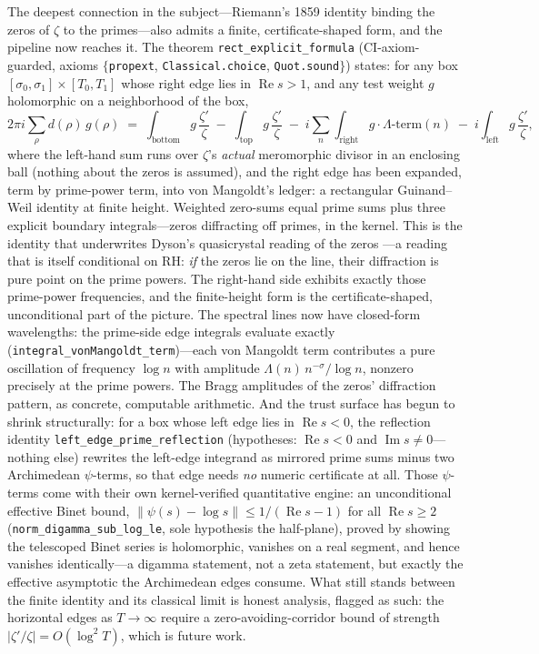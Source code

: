 The deepest connection in the subject---Riemann's 1859 identity binding the
zeros of $\zeta$ to the primes---also admits a finite, certificate-shaped form,
and the pipeline now reaches it. The theorem
\texttt{rect\_explicit\_formula} (CI-axiom-guarded, axioms
$\{$\texttt{propext}, \texttt{Classical.choice}, \texttt{Quot.sound}$\}$) states:
for any box $[\sigma_0,\sigma_1] \times [T_0,T_1]$ whose right edge lies in
$\operatorname{Re} s > 1$, and any test weight $g$ holomorphic on a neighborhood
of the box,
\[
  2\pi i \sum_{\rho} d(\rho)\, g(\rho)
  \;=\; \int_{\mathrm{bottom}} g\,\frac{\zeta'}{\zeta}
  \;-\; \int_{\mathrm{top}} g\,\frac{\zeta'}{\zeta}
  \;-\; i \sum_{n}\int_{\mathrm{right}} g \cdot \Lambda\text{-term}(n)
  \;-\; i \int_{\mathrm{left}} g\,\frac{\zeta'}{\zeta},
\]
where the left-hand sum runs over $\zeta$'s \emph{actual} meromorphic divisor in
an enclosing ball (nothing about the zeros is assumed), and the right edge has
been expanded, term by prime-power term, into von Mangoldt's ledger: a
rectangular Guinand--Weil identity \cite{guinand1948,weil1952} at finite height.
Weighted zero-sums equal prime sums plus three explicit boundary integrals---zeros
diffracting off primes, in the kernel. This is the identity that underwrites
Dyson's quasicrystal reading of the zeros \cite{dyson2009}---a reading that is
itself conditional on RH: \emph{if} the zeros lie on the line, their diffraction
is pure point on the prime powers. The right-hand side exhibits exactly those
prime-power frequencies, and the finite-height form is the certificate-shaped,
unconditional part of the picture. The spectral lines now have closed-form wavelengths: the prime-side
edge integrals evaluate exactly (\texttt{integral\_vonMangoldt\_term})---each von
Mangoldt term contributes a pure oscillation of frequency $\log n$ with
amplitude $\Lambda(n)\, n^{-\sigma}/\log n$, nonzero precisely at the prime
powers. The Bragg amplitudes of the zeros' diffraction pattern, as concrete,
computable arithmetic. And the trust surface has begun to shrink structurally:
for a box whose left edge lies in $\operatorname{Re} s < 0$, the reflection
identity \texttt{left\_edge\_prime\_reflection} (hypotheses: $\operatorname{Re}
s < 0$ and $\operatorname{Im} s \ne 0$---nothing else) rewrites the left-edge
integrand as mirrored prime sums minus two Archimedean $\psi$-terms, so that
edge needs \emph{no} numeric certificate at all. Those $\psi$-terms come with
their own kernel-verified quantitative engine: an unconditional effective Binet
bound, $\lVert \psi(s) - \log s \rVert \le 1/(\operatorname{Re} s - 1)$ for all
$\operatorname{Re} s \ge 2$ (\texttt{norm\_digamma\_sub\_log\_le}, sole
hypothesis the half-plane), proved by showing the telescoped Binet series is
holomorphic, vanishes on a real segment, and hence vanishes identically---a
digamma statement, not a zeta statement, but exactly the effective asymptotic
the Archimedean edges consume. What still stands between the
finite identity and its classical limit is honest analysis, flagged as such:
the horizontal edges as $T \to \infty$ require a zero-avoiding-corridor bound
of strength $|\zeta'/\zeta| = O(\log^2 T)$, which is future work.

